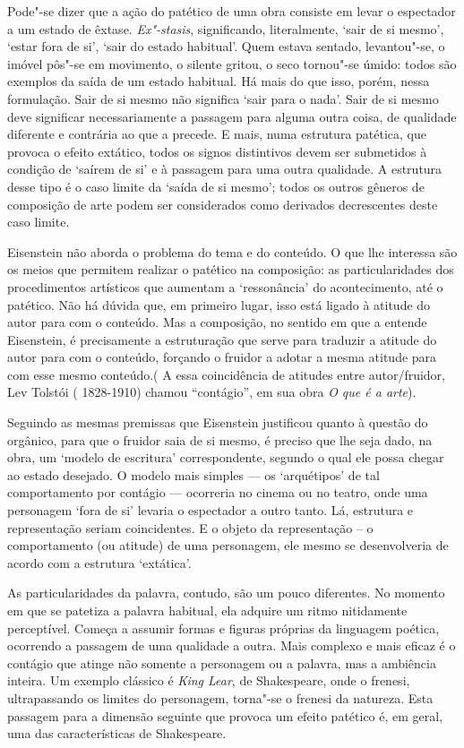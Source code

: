 Pode"-se dizer que a ação do patético de uma obra consiste em levar o
espectador a um estado de êxtase. \emph{Ex"-stasis}, significando,
literalmente, `sair de si mesmo', `estar fora de si', `sair do estado
habitual'. Quem estava sentado, levantou"-se, o imóvel pôs"-se em
movimento, o silente gritou, o seco tornou"-se úmido: todos são exemplos
da saída de um estado habitual. Há mais do que isso, porém, nessa
formulação. Sair de si mesmo não significa `sair para o nada'. Sair de
si mesmo deve significar necessariamente a passagem para alguma outra
coisa, de qualidade diferente e contrária ao que a precede. E mais, numa
estrutura patética, que provoca o efeito extático, todos os signos
distintivos devem ser submetidos à condição de `saírem de si' e à
passagem para uma outra qualidade. A estrutura desse tipo é o caso
limite da `saída de si mesmo'; todos os outros gêneros de composição de
arte podem ser considerados como derivados decrescentes deste caso
limite.

Eisenstein não aborda o problema do tema e do conteúdo. O que lhe
interessa são os meios que permitem realizar o patético na composição:
as particularidades dos procedimentos artísticos que aumentam a
`ressonância' do acontecimento, até o patético. Não há dúvida que, em
primeiro lugar, isso está ligado à atitude do autor para com o conteúdo.
Mas a composição, no sentido em que a entende Eisenstein, é precisamente
a estruturação que serve para traduzir a atitude do autor para com o
conteúdo, forçando o fruidor a adotar a mesma atitude para com esse
mesmo conteúdo.( A essa coincidência de atitudes entre autor/fruidor,
Lev Tolstói ( 1828-1910) chamou ``contágio'', em sua obra \emph{O que é
a arte}).

Seguindo as mesmas premissas que Eisenstein justificou quanto à questão
do orgânico, para que o fruidor saia de si mesmo, é preciso que lhe seja
dado, na obra, um `modelo de escritura' correspondente, segundo o qual
ele possa chegar ao estado desejado. O modelo mais simples --- os
`arquétipos' de tal comportamento por contágio --- ocorreria no cinema
ou no teatro, onde uma personagem `fora de si' levaria o espectador a
outro tanto. Lá, estrutura e representação seriam coincidentes. E o
objeto da representação -- o comportamento (ou atitude) de uma
personagem, ele mesmo se desenvolveria de acordo com a estrutura
`extática'.

As particularidades da palavra, contudo, são um pouco diferentes. No
momento em que se patetiza a palavra habitual, ela adquire um ritmo
nitidamente perceptível. Começa a assumir formas e figuras próprias da
linguagem poética, ocorrendo a passagem de uma qualidade a outra. Mais
complexo e mais eficaz é o contágio que atinge não somente a personagem
ou a palavra, mas a ambiência inteira. Um exemplo clássico é \emph{King
Lear}, de Shakespeare, onde o frenesi, ultrapassando os limites do
personagem, torna"-se o frenesi da natureza. Esta passagem para a
dimensão seguinte que provoca um efeito patético é, em geral, uma das
características de Shakespeare.

